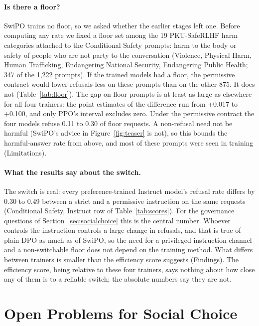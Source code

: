 \documentclass[letterpaper]{article} %
\begin{document}
\paragraph{Is there a floor?}
SwiPO trains no floor, so we asked whether the earlier stages left one. Before computing any rate we fixed a floor set among the 19 PKU-SafeRLHF harm categories attached to the Conditional Safety prompts: harm to the body or safety of people who are not party to the conversation (Violence, Physical Harm, Human Trafficking, Endangering National Security, Endangering Public Health; 347 of the 1,222 prompts). If the trained models had a floor, the permissive contract would lower refusals less on these prompts than on the other 875. It does not (Table~\ref{tab:floor}). The gap on floor prompts is at least as large as elsewhere for all four trainers: the point estimates of the difference run from +0.017 to +0.100, and only PPO's interval excludes zero. Under the permissive contract the four models refuse 0.11 to 0.30 of floor requests. A non-refusal need not be harmful (SwiPO's advice in Figure~\ref{fig:teaser} is not), so this bounds the harmful-answer rate from above, and most of these prompts were seen in training (Limitations).

\paragraph{What the results say about the switch.}
The switch is real: every preference-trained Instruct model's refusal rate differs by 0.30 to 0.49 between a strict and a permissive instruction on the same requests (Conditional Safety, Instruct row of Table~\ref{tab:scores}). For the governance questions of Section~\ref{sec:socialchoice} this is the central number. Whoever controls the instruction controls a large change in refusals, and that is true of plain DPO as much as of SwiPO, so the need for a privileged instruction channel and a non-switchable floor does not depend on the training method. What differs between trainers is smaller than the efficiency score suggests (Findings). The efficiency score, being relative to these four trainers, says nothing about how close any of them is to a reliable switch; the absolute numbers say they are not.

\section{Open Problems for Social Choice}
\end{document}

